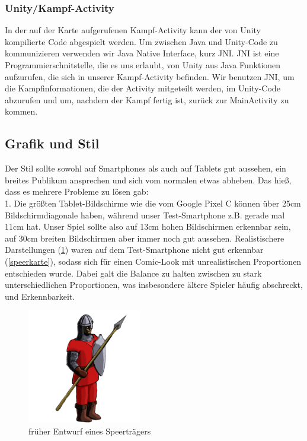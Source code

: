 \documentclass[extern,palatino]{cgBA}
\begin{document}
\subsubsection{Unity/Kampf-Activity}
In der auf der Karte aufgerufenen Kampf-Activity kann der von Unity kompilierte Code abgespielt werden. Um zwischen Java und Unity-Code zu kommunizieren verwenden wir Java Native Interface, kurz JNI. JNI ist eine Programmierschnitstelle, die es uns erlaubt, von Unity aus Java Funktionen aufzurufen, die sich in unserer Kampf-Activity befinden. Wir benutzen JNI, um die Kampfinformationen, die der Activity mitgeteilt werden, im Unity-Code abzurufen und um, nachdem der Kampf fertig ist, zurück zur MainActivity zu kommen.

\newpage
\subsection{Grafik und Stil}
Der Stil sollte sowohl auf Smartphones als auch auf Tablets gut aussehen, ein breites Publikum ansprechen und sich vom normalen etwas abheben. Das hieß, dass es mehrere Probleme zu lösen gab:
\\1. Die größten Tablet-Bildschirme wie die vom Google Pixel C können über 25cm Bildschirmdiagonale haben, während unser Test-Smartphone z.B. gerade mal 11cm hat. Unser Spiel sollte also auf 13cm hohen Bildschirmen erkennbar sein, auf 30cm breiten Bildschirmen aber immer noch gut aussehen. Realistischere Darstellungen (\ref{speerträger}) waren auf dem Test-Smartphone  nicht gut erkennbar (\ref{speerkarte}), sodass sich für einen Comic-Look mit unrealistischen Proportionen entschieden wurde. Dabei galt die Balance zu halten zwischen zu stark unterschiedlichen Proportionen, was insbesondere ältere Spieler häufig abschreckt, und Erkennbarkeit.
\begin{figure}
	\centering
	\includegraphics[height=5cm]{soldier.png}
	\caption{früher Entwurf eines Speerträgers}
	\label{speerträger}
\end{figure}
\end{document}
